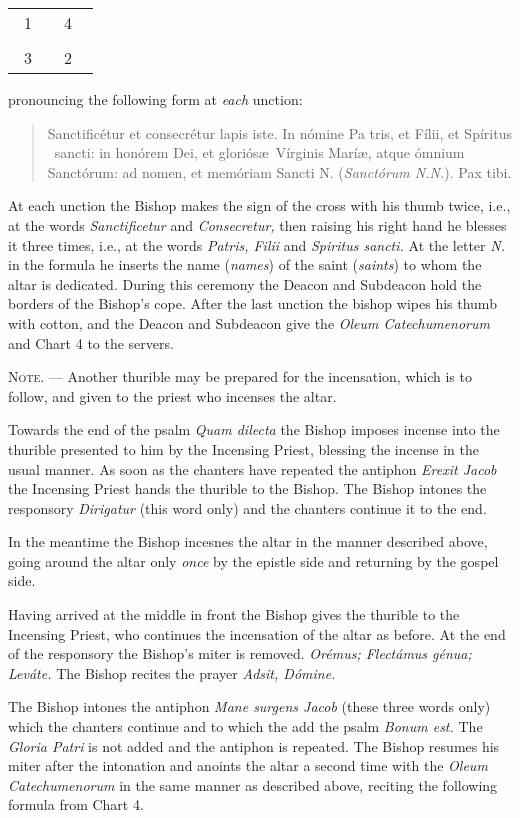 \documentclass[letterpaper]{report}
\newcommand\crossplan{
\begin{center}
    \begin{tabular}{ | l c r | }
       \hline
        \cross\ {\small 1} &        & {\small 4} \cross\ \\
                           & \cross &           \\
        \cross\ {\small 3} &        & {\small 2} \cross\ \\
       \hline
   \end{tabular} 
\end{center}
}
\begin{document}
{\crossplan

pronouncing the following form at \textit{each} unction:

\begin{quote}
    Sancti\cross ficétur et conse\cross crétur lapis iste. In nómine Pa\cross
    tris, et Fí\cross lii, et Spíritus \cross\ sancti: in honórem Dei, et
    gloriós\ae\ Vírginis Marí\ae, atque ómnium Sanctórum: ad nomen, et memóriam
    Sancti N. (\textit{Sanctórum N.N.}). Pax tibi.
\end{quote}

At each unction the Bishop makes the sign of the cross with his thumb twice,
i.e., at the words \textit{Sanctificetur} and \textit{Consecretur,} then
raising his right hand he blesses it three times, i.e., at the words
\textit{Patris, Filii} and \textit{Spiritus sancti.} At the letter \textit{N.}
in the formula he inserts the name (\textit{names}) of the saint
(\textit{saints}) to whom the altar is dedicated. During this ceremony the
Deacon and Subdeacon hold the borders of the Bishop's cope. After the last
unction the bishop wipes his thumb with cotton, and the Deacon and Subdeacon
give the \textit{Oleum Catechumenorum} and Chart 4 to the servers.

\textsc{Note. ---} Another thurible may be prepared for the incensation, which
is to follow, and given to the priest who incenses the altar.

\rubric Towards the end of the psalm \textit{Quam dilecta} the Bishop imposes
incense into the thurible presented to him by the Incensing Priest, blessing
the incense in the usual manner. As soon as the chanters have repeated the
antiphon \textit{Erexit Jacob} the Incensing Priest hands the thurible to the
Bishop. The Bishop intones the responsory \textit{Dirigatur} (this word only)
and the chanters continue it to the end.

In the meantime the Bishop incesnes the altar in the manner described above,
going around the altar only \textit{once} by the epistle side and returning by
the gospel side.

\rubric Having arrived at the middle in front the Bishop gives the thurible to
the Incensing Priest, who continues the incensation of the altar as before. At
the end of the responsory the Bishop's miter is removed. \textit{Orémus;
Flectámus génua; Leváte.} The Bishop recites the prayer \textit{Adsit, Dómine.}

\rubric The Bishop intones the antiphon \textit{Mane surgens Jacob} (these
three words only) which the chanters continue and to which the add the psalm
\textit{Bonum est.} The \textit{Gloria Patri} is not added and the antiphon is
repeated. The Bishop resumes his miter after the intonation and anoints the
altar a second time with the \textit{Oleum Catechumenorum} in the same manner
as described above, reciting the following formula from Chart 4.

}
\end{document}
